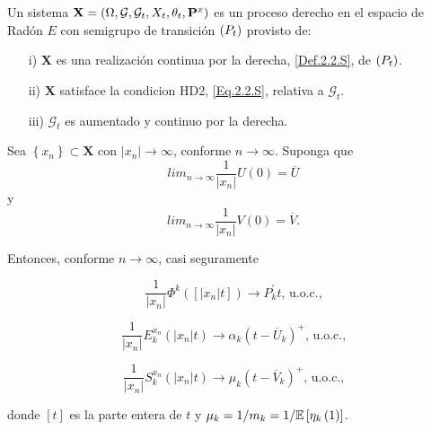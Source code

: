 \begin{Def}\label{Def.PD}
Un sistema $\mathbf{X}=\left(\Omega,\mathcal{G},\mathcal{G}_{t},X_{t},\theta_{t},\mathbf{P}^{x}\right)$ es un proceso derecho en el espacio de Rad\'on $E$ con semigrupo de transici\'on $\left(P_{t}\right)$ provisto de:
\begin{itemize}
\item[i)] $\mathbf{X}$ es una realizaci\'on  continua por la derecha, \ref{Def.2.2.S}, de $\left(P_{t}\right)$.

\item[ii)] $\mathbf{X}$ satisface la condicion HD2, \ref{Eq.2.2.S}, relativa a $\mathcal{G}_{t}$.

\item[iii)] $\mathcal{G}_{t}$ es aumentado y continuo por la derecha.
\end{itemize}
\end{Def}




\begin{Lema}\label{Lema4.2}
Sea $\left\{x_{n}\right\}\subset \mathbf{X}$ con
$|x_{n}|\rightarrow\infty$, conforme $n\rightarrow\infty$. Suponga
que
\[lim_{n\rightarrow\infty}\frac{1}{|x_{n}|}U\left(0\right)=\overline{U}\]
y
\[lim_{n\rightarrow\infty}\frac{1}{|x_{n}|}V\left(0\right)=\overline{V}.\]

Entonces, conforme $n\rightarrow\infty$, casi seguramente

\begin{equation}\label{E1.4.2}
\frac{1}{|x_{n}|}\Phi^{k}\left(\left[|x_{n}|t\right]\right)\rightarrow
P_{k}^{'}t\textrm{, u.o.c.,}
\end{equation}

\begin{equation}\label{E1.4.3}
\frac{1}{|x_{n}|}E^{x_{n}}_{k}\left(|x_{n}|t\right)\rightarrow
\alpha_{k}\left(t-\overline{U}_{k}\right)^{+}\textrm{, u.o.c.,}
\end{equation}

\begin{equation}\label{E1.4.4}
\frac{1}{|x_{n}|}S^{x_{n}}_{k}\left(|x_{n}|t\right)\rightarrow
\mu_{k}\left(t-\overline{V}_{k}\right)^{+}\textrm{, u.o.c.,}
\end{equation}

donde $\left[t\right]$ es la parte entera de $t$ y
$\mu_{k}=1/m_{k}=1/\mathbb{E}\left[\eta_{k}\left(1\right)\right]$.
\end{Lema}

